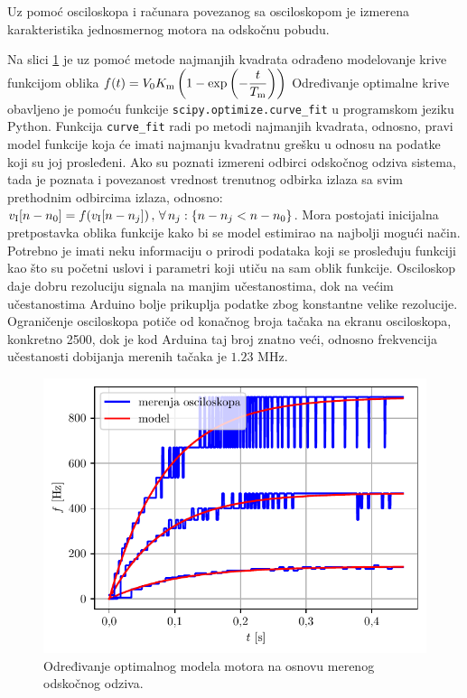 \documentclass[a4paper, 12pt, diplomski]{etf}
\begin{document}
\noindent
Uz pomoć osciloskopa i računara povezanog sa osciloskopom je izmerena karakteristika jednosmernog motora na odskočnu pobudu.

\noindent
Na slici \ref{compact} je uz pomoć metode najmanjih kvadrata odrađeno modelovanje krive funkcijom oblika 
$f(t) = V_0K_{\rm m}\left(1 - \exp \left( - \dfrac{t}{T_{\rm m}}  \right) \right) $
Određivanje optimalne krive obavljeno je pomoću funkcije 
\verb|scipy.optimize.curve_fit| u programskom jeziku Python. 
Funkcija \verb|curve_fit| radi po metodi najmanjih kvadrata, odnosno, pravi model funkcije koja će imati najmanju kvadratnu grešku u odnosu na podatke koji su joj prosleđeni.
Ako su poznati izmereni odbirci odskočnog odziva sistema, tada je poznata i povezanost vrednost trenutnog odbirka izlaza sa svim prethodnim odbircima izlaza, odnosno: $v_{\rm I}[n-n_0] = f(v_{\rm I}[n - n_j]) \, , \, \forall \, n_j : \{n - n_j < n - n_0\}$.
Mora postojati inicijalna pretpostavka oblika funkcije kako bi se model estimirao na najbolji mogući način. Potrebno je imati neku informaciju o prirodi podataka koji se prosleđuju funkciji kao što su početni uslovi i parametri koji utiču na sam oblik funkcije. Osciloskop daje dobru rezoluciju signala na manjim učestanostima, dok na većim učestanostima Arduino bolje prikuplja podatke zbog konstantne velike rezolucije. Ograničenje osciloskopa potiče od konačnog broja tačaka na ekranu osciloskopa, konkretno 2500, dok je kod Arduina taj broj znatno veći, odnosno frekvencija učestanosti dobijanja merenih tačaka je $1.23$ MHz.


\begin{figure}[h!]
    \centering
    \includegraphics[scale=1]{fig_osc/compact.pdf}
    \caption{Određivanje optimalnog modela motora na osnovu merenog odskočnog odziva.}
    \label{compact}
\end{figure}
\end{document}
